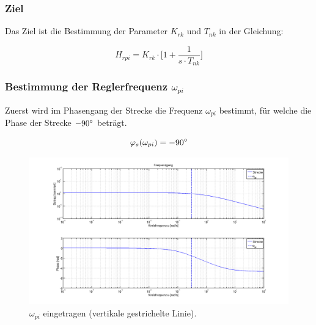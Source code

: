 \subsubsection*{Ziel}
Das  Ziel ist  die  Bestimmung  der Parameter  $K_{rk}$  und  $T_{nk}$ in  der
Gleichung:

\begin{equation} \label{eq:pi:target}
    H_{rpi} = K_{rk} \cdot \biggl[ 1 + \frac{1}{s \cdot T_{nk}} \biggr]
\end{equation}


\subsubsection{Bestimmung der Reglerfrequenz $\omega_{pi}$}

Zuerst wird im Phasengang der Strecke die Frequenz $\omega_{pi}$ bestimmt, f\"ur
welche die Phase der Strecke $-90\degree$ betr\"agt\footnotemark[1].

\begin{equation} \label{eq:pi:phi_s}
    \varphi_s(\omega_{pi}) = -90 \degree
\end{equation}


\begin{figure}[h! width=\pagewidth]
    \includegraphics[width=\textwidth]{images/piStreckeOmegaPI.png}
    \caption{%
        $\omega_{pi}$ eingetragen (vertikale gestrichelte Linie).
    }
    \label{fig:pi:omega_pi}
\end{figure}

